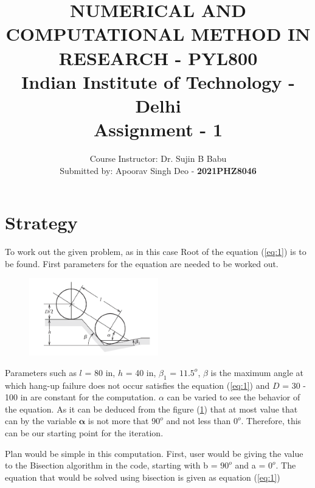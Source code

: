 \documentclass[11pt,a4paper]{article}
\begin{document}
	\title{NUMERICAL AND COMPUTATIONAL METHOD IN RESEARCH - PYL800\\
	Indian Institute of Technology - Delhi \\
	Assignment - 1}
	
	\author{Course Instructor: Dr. Sujin B Babu \\ 
	Submitted by: Apoorav Singh Deo - \textbf{2021PHZ8046} }
	\maketitle
	

\section*{Strategy}	

To work out the given problem, as in this case Root of the equation (\ref{eq:1}) is to be found. First parameters for the equation are needed to be worked out.

	\begin{figure}[H]	
	\begin{center}
	\includegraphics[width=0.5\textwidth]{problem_fig.png}
	\caption{}
	\label{fig:1}	
	\end{center}
	\end{figure}

Parameters such as $l$ = 80 in, $h$ = 40 in, $\beta_1$ = $11.5^o$, $\beta$  is the
maximum angle at which hang-up failure does not occur satisfies the equation (\ref{eq:1}) and $D$ = 30 - 100 in are constant for the computation. $\alpha$ can be varied to see the behavior of the equation. As it can be deduced from the figure (\ref{fig:1}) that at most value that can by the variable $\mathbf{\alpha}$ is not more that $90^o$ and not less than $0^o$. Therefore, this can be our starting point for the iteration.\medskip

Plan would be simple in this computation. First, user would be giving the value to the Bisection algorithm in the code, starting with b = $90^o$ and a = $0^o$. The equation that would be solved using bisection is given as equation (\ref{eq:1})
\end{document}
